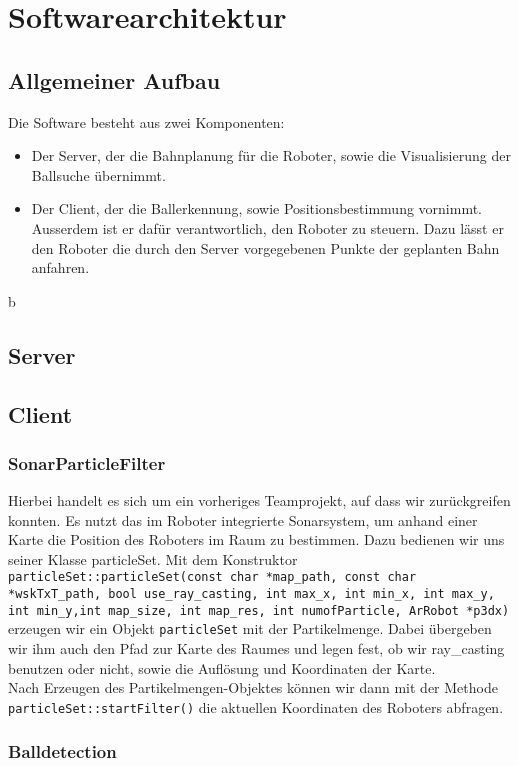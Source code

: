 
\chapter{Softwarearchitektur}
\label{cha:softwarearchitektur}

\section{Allgemeiner Aufbau}
\label{sec:allgemeiner-aufbau}

Die Software besteht aus zwei Komponenten:
\begin{itemize}
\item Der Server, der die Bahnplanung für die Roboter, sowie die
  Visualisierung der Ballsuche übernimmt.
\item Der Client, der die Ballerkennung, sowie Positionsbestimmung
  vornimmt. Ausserdem ist er dafür verantwortlich, den Roboter zu
  steuern. Dazu lässt er den Roboter die durch den Server vorgegebenen
  Punkte der geplanten Bahn anfahren. 
\end{itemize}
b
\section{Server}
\label{sec:server}

\section{Client}
\label{sec:client}

\subsection{SonarParticleFilter}
\label{sec:sonarparticlefilter}
Hierbei handelt es sich um ein vorheriges Teamprojekt, auf dass wir
zurückgreifen konnten. Es nutzt das im Roboter integrierte
Sonarsystem, um anhand einer Karte die Position des Roboters im Raum
zu bestimmen. Dazu bedienen wir uns seiner Klasse particleSet. 
Mit dem Konstruktor \lstinline|particleSet::particleSet(const char
*map_path, const char *wskTxT_path, bool use_ray_casting, int max_x,
int min_x, int max_y, int min_y,int map_size, int map_res, int
numofParticle, ArRobot *p3dx)| erzeugen wir ein Objekt
\lstinline|particleSet| mit der Partikelmenge. Dabei übergeben wir ihm auch den Pfad zur
Karte des Raumes und legen fest, ob wir ray_casting benutzen oder
nicht, sowie die Auflösung und Koordinaten der Karte.  \\
Nach Erzeugen des Partikelmengen-Objektes können wir dann mit der
Methode \lstinline|particleSet::startFilter()| die aktuellen
Koordinaten des Roboters abfragen.
\subsection{Balldetection}
\label{sec:balldetection}




